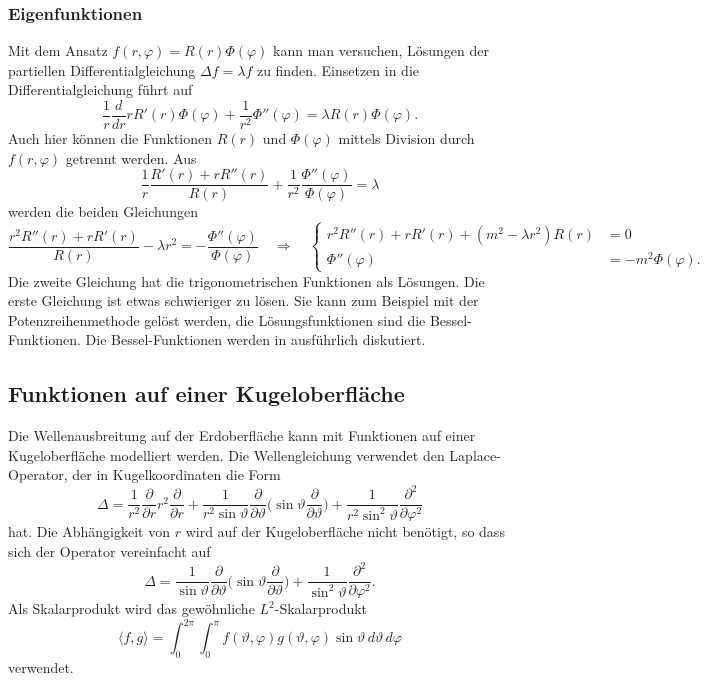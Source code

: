 \subsubsection{Eigenfunktionen}
Mit dem Ansatz $f(r,\varphi) = R(r) \Phi(\varphi)$ kann man versuchen,
Lösungen der partiellen Differentialgleichung $\Delta f=\lambda f$
zu finden.
Einsetzen in die Differentialgleichung führt auf
\[
\frac1r \frac{d}{dr} rR'(r) \Phi(\varphi)
+
\frac1{r^2} \Phi''(\varphi)
=
\lambda R(r)\Phi(\varphi).
\]
Auch hier können die Funktionen $R(r)$ und $\Phi(\varphi)$ mittels
Division durch $f(r,\varphi)$ getrennt werden.
Aus
\[
\frac1r \frac{R'(r) + rR''(r)}{R(r)}
+
\frac{1}{r^2}\frac{\Phi''(\varphi)}{\Phi(\varphi)}
=
\lambda
\]
werden die beiden Gleichungen
\[
\frac{r^2R''(r) + rR'(r)}{R(r)}
-
\lambda r^2
=
-\frac{\Phi''(\varphi)}{\Phi(\varphi)}
\quad\Rightarrow\quad
\left\{
\begin{aligned}
r^2R''(r) + rR'(r) +(m^2 - \lambda r^2)R(r) &= 0
\\
\Phi''(\varphi)&=-m^2 \Phi(\varphi).
\end{aligned}
\right.
\]
Die zweite Gleichung hat die trigonometrischen Funktionen
als Lösungen.
Die erste Gleichung ist etwas schwieriger zu lösen.
Sie kann zum Beispiel mit der Potenzreihenmethode gelöst werden, die
Lösungsfunktionen sind die Bessel-Funktionen.
Die Bessel-Funktionen werden in \cite{buch:mathsem-spezfunk} 
ausführlich diskutiert.

%
%
\subsection{Funktionen auf einer Kugeloberfläche}
Die Wellenausbreitung auf der Erdoberfläche kann mit Funktionen
auf einer Kugeloberfläche modelliert werden.
Die Wellengleichung verwendet den Laplace-Operator, der in Kugelkoordinaten
die Form
\begin{equation}
\Delta
=
\frac{1}{r^2}
\frac{\partial}{\partial r}
r^2
\frac{\partial}{\partial r}
+
\frac{1}{r^2\sin\vartheta}
\frac{\partial}{\partial\vartheta}
\biggl(\sin\vartheta\frac{\partial}{\partial\vartheta}\biggr)
+
\frac{1}{r^2\sin^2\vartheta}
\frac{\partial^2}{\partial\varphi^2}
\label{buch:orthofkt:pde:laplacekugel}
\end{equation}
hat.
Die Abhängigkeit von $r$ wird auf der Kugeloberfläche nicht benötigt,
so dass sich der Operator vereinfacht auf
\[
\Delta
=
\frac{1}{\sin\vartheta}
\frac{\partial}{\partial\vartheta}
\biggl(\sin\vartheta\frac{\partial}{\partial\vartheta}\biggr)
+
\frac{1}{\sin^2\vartheta}
\frac{\partial^2}{\partial\varphi^2}.
\]
Als Skalarprodukt wird das gewöhnliche $L^2$-Skalarprodukt
\[
\langle f,g\rangle
=
\int_{0}^{2\pi}
\int_0^\pi
f(\vartheta,\varphi)
g(\vartheta,\varphi)
\sin \vartheta
\,d\vartheta
\,d\varphi
\]
verwendet.

